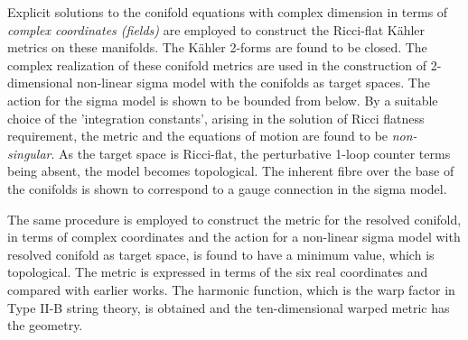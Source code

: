 \documentclass[a4paper,12pt]{article}
\begin{document}
{

\vspace{0.5cm}

Explicit solutions to the conifold equations with complex dimension \coordHE{} 
in terms of {\it{complex coordinates (fields)}} are employed to construct 
the Ricci-flat K\"{a}hler metrics on these manifolds. The K\"{a}hler 
2-forms are found to be closed. The complex realization of these conifold 
metrics are used in the construction of 2-dimensional non-linear sigma model 
with the conifolds as target spaces. The action for the sigma model is shown 
to be bounded from below. By a suitable choice of the 'integration constants', 
arising in the solution of Ricci flatness requirement, the metric and the 
equations of motion are found to be {\it{non-singular}}. 
As the target space is Ricci-flat,
the perturbative 1-loop counter terms being absent, the model becomes 
topological. The inherent \coordHE{} fibre over the base of the conifolds is shown 
to correspond to a gauge connection in the sigma model.  

The same procedure is employed to construct the metric for the resolved 
conifold, in terms of complex coordinates and the action for a non-linear 
sigma model with resolved conifold as target space, is found to have a 
minimum value, which is topological. The metric is expressed in terms of the 
six real coordinates and compared with earlier works. The harmonic function,
which is the warp factor in Type II-B string theory, is obtained and the 
ten-dimensional warped metric has the \coordHE{} geometry. 

\newpage 	
{}

\vspace{0.5cm}

}
\end{document}
